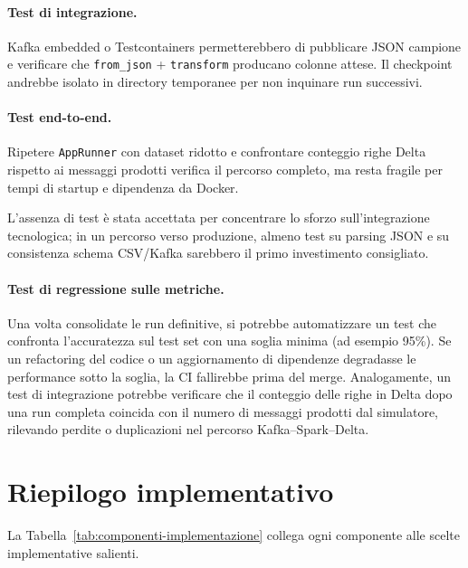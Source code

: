 \paragraph{Test di integrazione.}
Kafka embedded o Testcontainers permetterebbero di pubblicare JSON campione e verificare che \texttt{from\_json} + \texttt{transform} producano colonne attese.
Il checkpoint andrebbe isolato in directory temporanee per non inquinare run successivi.

\paragraph{Test end-to-end.}
Ripetere \texttt{AppRunner} con dataset ridotto e confrontare conteggio righe Delta rispetto ai messaggi prodotti verifica il percorso completo, ma resta fragile per tempi di startup e dipendenza da Docker.

L'assenza di test è stata accettata per concentrare lo sforzo sull'integrazione tecnologica; in un percorso verso produzione, almeno test su parsing JSON e su consistenza schema CSV/Kafka sarebbero il primo investimento consigliato.

\paragraph{Test di regressione sulle metriche.}
Una volta consolidate le run definitive, si potrebbe automatizzare un test che confronta l'accuratezza sul test set con una soglia minima (ad esempio 95\%).
Se un refactoring del codice o un aggiornamento di dipendenze degradasse le performance sotto la soglia, la CI fallirebbe prima del merge.
Analogamente, un test di integrazione potrebbe verificare che il conteggio delle righe in Delta dopo una run completa coincida con il numero di messaggi prodotti dal simulatore, rilevando perdite o duplicazioni nel percorso Kafka--Spark--Delta.

\section{Riepilogo implementativo}

La Tabella~\ref{tab:componenti-implementazione} collega ogni componente alle scelte implementative salienti.


